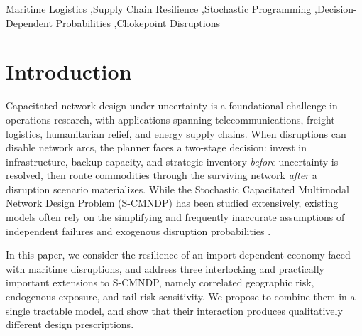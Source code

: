 \documentclass[final,3p,authoryear]{elsarticle}
\theoremstyle{definition}
\begin{document}
\begin{frontmatter}
\begin{abstract}
analyst-set exposure sensitivity to 8.18\% at the probability-validity
boundary; the mean--CVaR frontier exhibits a design phase transition at
confidence level $\alpha\approx 0.75$; and the value of modeling
correlation is identically zero across all $\rho$- and
$\gamma$-stress tests, a substantive finding that we interpret as
\emph{structural joint-failure resilience} of the calibrated network:
the diversified route-and-inventory portfolio selected by the
stochastic program absorbs joint-corridor disruption through the same
hedging mechanism that absorbs single-corridor disruption. LPG emerges
as the most exposed commodity under the optimal policy, while crude oil
is fully hedgeable via pipeline bypass and strategic reserves.
\end{abstract}

\begin{keyword}
Maritime Logistics \sep Supply Chain Resilience \sep Stochastic Programming \sep Decision-Dependent Probabilities \sep Chokepoint Disruptions
\end{keyword}

\end{frontmatter}



\section{Introduction}
\label{sec:introduction}

Capacitated network design under uncertainty is a foundational challenge in
operations research, with applications spanning telecommunications, freight
logistics, humanitarian relief, and energy supply chains. When disruptions
can disable network arcs, the planner faces a two-stage decision: invest in
infrastructure, backup capacity, and strategic inventory \emph{before}
uncertainty is resolved, then route commodities through the surviving
network \emph{after} a disruption scenario materializes. 
While the Stochastic Capacitated Multimodal Network Design Problem (S-CMNDP) has been studied extensively, existing models often rely on the simplifying and frequently inaccurate assumptions of independent failures and exogenous disruption probabilities \citep{snyder2005, lim2010}. 

In this paper, we consider the resilience of an import-dependent economy faced with maritime disruptions, and address three interlocking and practically important extensions to S-CMNDP, namely correlated geographic risk, endogenous exposure, and tail-risk sensitivity. We propose to combine them in a single tractable model, and show that their interaction produces qualitatively different design prescriptions.
\end{document}
